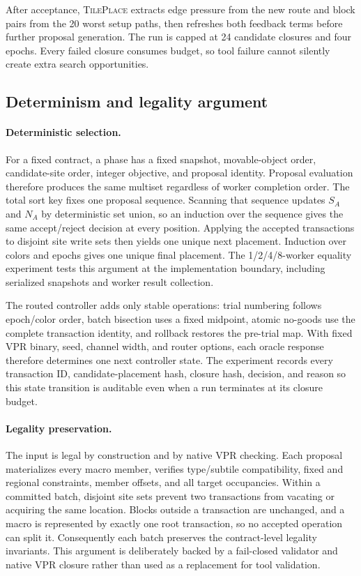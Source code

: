 \documentclass[sigconf,anonymous,review]{acmart}
\newcommand{\system}{\textsc{TilePlace}}
\newcommand{\vpr}{\textsc{VPR}}
\begin{document}
After acceptance, \system{} extracts edge pressure from the new route and
block pairs from the 20 worst setup paths, then refreshes both feedback terms
before further proposal generation.  The run is capped at 24 candidate
closures and four epochs.  Every failed closure consumes budget, so tool
failure cannot silently create extra search opportunities.

\subsection{Determinism and legality argument}

\paragraph{Deterministic selection.}
For a fixed contract, a phase has a fixed snapshot, movable-object order,
candidate-site order, integer objective, and proposal identity.  Proposal
evaluation therefore produces the same multiset regardless of worker
completion order.  The total sort key fixes one proposal sequence.  Scanning
that sequence updates $S_A$ and $N_A$ by deterministic set union, so an
induction over the sequence gives the same accept/reject decision at every
position.  Applying the accepted transactions to disjoint site write sets
then yields one unique next placement.  Induction over colors and epochs gives
one unique final placement.  The 1/2/4/8-worker equality experiment tests this
argument at the implementation boundary, including serialized snapshots and
worker result collection.

The routed controller adds only stable operations: trial numbering follows
epoch/color order, batch bisection uses a fixed midpoint, atomic no-goods use
the complete transaction identity, and rollback restores the pre-trial map.
With fixed \vpr{} binary, seed, channel width, and router options, each oracle
response therefore determines one next controller state.  The experiment
records every transaction ID, candidate-placement hash, closure hash, decision,
and reason so this state transition is auditable even when a run terminates at
its closure budget.

\paragraph{Legality preservation.}
The input is legal by construction and by native \vpr{} checking.  Each
proposal materializes every macro member, verifies type/subtile compatibility,
fixed and regional constraints, member offsets, and all target occupancies.
Within a committed batch, disjoint site sets prevent two transactions from
vacating or acquiring the same location.  Blocks outside a transaction are
unchanged, and a macro is represented by exactly one root transaction, so no
accepted operation can split it.  Consequently each batch preserves the
contract-level legality invariants.  This argument is deliberately backed by
a fail-closed validator and native \vpr{} closure rather than used as a
replacement for tool validation.
\end{document}
